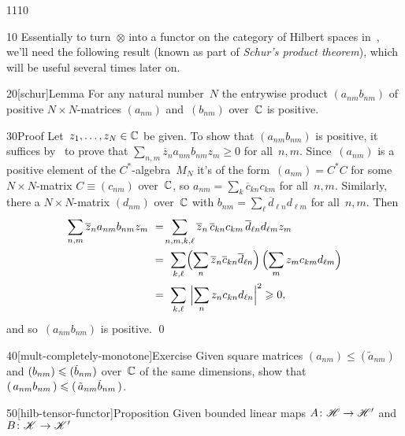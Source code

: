\begin{parsec}{1110}%
\begin{point}{10}%
Essentially to turn~$\otimes$
into a functor on
the category of Hilbert spaces
in~,
we'll need
the following result
(known as part of \emph{Schur's product theorem}),%
which will be useful several times later on.
\end{point}
\begin{point}{20}[schur]{Lemma}%
For any natural number~$N$
the entrywise product 
$(a_{nm}b_{nm})$
of positive  $N\times N$-matrices
$(a_{nm})$ and~$(b_{nm})$
over~$\C$
is positive.
\begin{point}{30}{Proof}%
Let~$z_1,\dotsc,z_N\in\C$ be given.
To show that $(a_{nm}b_{nm})$
is positive,
it suffices by~ 
to prove that
$\sum_{n,m} \overline{z}_n a_{nm} b_{nm} z_m \geq 0$
for all~$n,m$.
Since~$(a_{nm})$
is a positive element
of the $C^*$-algebra~$M_N$
it's of the form~$(a_{nm})=C^*C$
for some $N\times N$-matrix $C\equiv(c_{nm})$
over~$\C$,
so  $a_{nm} = \sum_k \overline{c}_{kn} c_{km}$
for all~$n,m$.
Similarly, there a $N\times N$-matrix
$(d_{nm})$ over~$\C$
with $b_{nm} = \sum_\ell \overline{d}_{\ell n}
d_{\ell m}$
for all~$n,m$.
Then
\begin{alignat*}{3}
	\sum_{n,m} \overline{z}_n
a_{nm} b_{nm} z_m
\ &=\  \hspace{-.5em} \sum_{n,m,k,\ell}
\overline{z}_n \,\overline{c}_{kn}
c_{km} \,\overline{d}_{\ell n} d_{\ell m} z_m\,
\\
\ &=\  \sum_{k,\ell}
\Bigl(\sum_n
\overline{z}_n\overline{c}_{kn}
\overline{d}_{\ell n} \Bigr)
\,
\Bigl(
\sum_m
z_m
c_{km} 
d_{\ell m} 
\Bigr)
\\
\ &=\  \sum_{k,\ell}\ 
\Bigl|\sum_n z_n c_{kn} d_{\ell n} \Bigr|^2 \geq 0,
\end{alignat*}
and so~$(a_{nm}b_{nm})$ is positive.
\qed
\end{point}
\end{point}
\begin{point}{40}[mult-completely-monotone]{Exercise}%
Given square matrices 
$(a_{nm})\leq (\tilde{a}_{nm})$
and $(b_{nm})\leq (\smash{\tilde{b}_{nm}})$
over~$\C$
of the same dimensions,
show that $(\,a_{nm}b_{nm}\,)\leq (\,\tilde{a}_{nm}\smash{\tilde{b}_{nm}}\,)$.
\end{point}
\begin{point}{50}[hilb-tensor-functor]{Proposition}%
Given bounded linear maps
$A\colon \scrH\to\scrH'$
and~$B\colon \scrK\to\scrK'$

\end{point}
\end{parsec}

